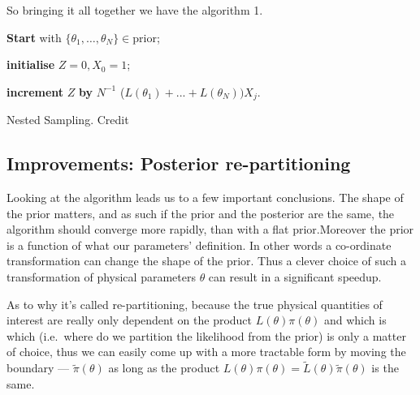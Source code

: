 \documentclass[12pt]{article}
\begin{document}
So bringing it all together we have the algorithm 1.
\begin{algorithm}
  \SetAlgoLined%
\textbf{Start} with  $\lbrace\theta_1, \ldots , \theta_N\rbrace \in \text{prior}$;

\textbf{initialise} $Z = 0, X_0 = 1$;


\textbf{increment} $Z$ \textbf{by} $N^{-1}$ ($L(\theta_1 ) + . . . + L(\theta_N )) X_j$.
\caption{Nested Sampling. Credit\cite{skilling2006}}
\end{algorithm}
\goodbreak%

\subsection{Improvements: Posterior re-partitioning}\label{sec-4-2}

Looking at the algorithm\autocite{chen-ferroz-hobson} leads us to a
few important conclusions. The shape of the prior matters, and as such
if the prior and the posterior are the same, the algorithm should
converge more rapidly, than with a flat prior.Moreover the prior is a
function of what our parameters' definition. In other words a
co-ordinate transformation can change the shape of the prior. Thus a
clever choice of such a transformation of physical parameters
\( \theta \) can result in a significant speedup.

As to why it's called re-partitioning, because the true physical
quantities of interest are really only dependent on the product
\( L (\theta) \pi (\theta) \) and which is which (i.e.~where do we partition the
likelihood from the prior) is only a matter of choice, thus we can
easily come up with a more tractable form by moving the boundary ---
\( \tilde{\pi} (\theta) \) as long as the product
\( L (\theta ) \pi (\theta) = \tilde{L} (\theta) \tilde{\pi} (\theta) \) is the same.
\end{document}
